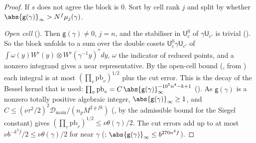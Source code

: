 \begin{proof}
If $s$ does not agree the block is $0$. Sort by cell rank $j$ and split by whether $\abs{\mathsf g(\gamma)}_\infty>N^f\mu_j(\gamma)$.

\emph{Open cell} (). Then $\mathsf
g(\gamma)\ne0$, $j=n$, and the stabiliser in $\mathsf U^0_c$ of $\gamma\mathsf U_{c'}$ is trivial
(). So the block unfolds to a sum over
the double cosets $\mathsf U^0_c\gamma\mathsf U_{c'}$ of $\int\omega(y)W^\flat(y)\otimes
W^\flat(\gamma^{-1}y)^*dy$, $\omega$ the indicator of reduced points, and a nonzero integrand gives
a near representative. By the open-cell bound (,
from ) each integral is at most
$(\prod_v\mathrm{pb}_v)^{1/2}$ plus the cut error. This is the decay of the Bessel kernel that is
used: $\prod_v\mathrm{pb}_v=C\,\abs{\mathsf g(\gamma)}_\infty^{-10^5n^4-k+1}$
(). As $\mathsf g(\gamma)$ is a nonzero totally positive
algebraic integer, $\abs{\mathsf g(\gamma)}_\infty\ge1$, and $C\le(\nu\tau^2/2)^2\mathcal D_{\mathrm{main}}/(n_p
M^{2\varrho fk})$ (, by the admissible bound for the Siegel
constant) gives $(\prod_v\mathrm{pb}_v)^{1/2}\le\nu\theta(\gamma)/2$. The cut errors add up to at most
$\nu b^{-k^3f}/2\le\nu\theta(\gamma)/2$ for near $\gamma$
(; $\abs{\mathsf g(\gamma)}_\infty\le b^{270n^2f}$).


\end{proof}
